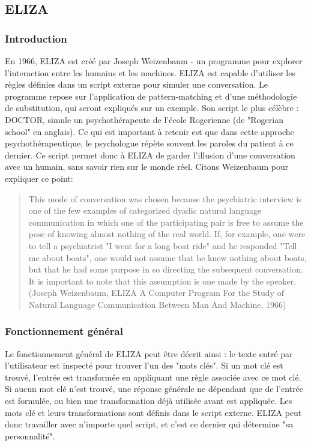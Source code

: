 \documentclass[11pt,a4paper]{report}
\begin{document}
    \subsection*{ELIZA}
      \subsubsection*{Introduction}
En 1966, ELIZA est créé par Joseph Weizenbaum - un programme pour explorer l'interaction entre les humains et 
les machines. ELIZA est capable d'utiliser les règles définies dans un script externe pour simuler 
une conversation. Le programme repose sur l'application de pattern-matching et d'une 
méthodologie de substitution, qui seront expliqués sur un exemple.
Son script le plus célèbre : DOCTOR, simule un psychothérapeute de l'école Rogerienne
(de "Rogerian school" en anglais). Ce qui est important à retenir est que dans cette approche 
psychothérapeutique, le psychologue répète souvent les paroles du patient à ce dernier. 
Ce script permet donc à ELIZA de garder l'illusion d'une conversation avec un humain, 
sans savoir rien sur le monde réel. Citons Weizenbaum pour expliquer ce point:

\begin{quote}
  This mode of conversation was chosen because the psychiatric interview is one of the 
  few examples of categorized dyadic natural 
  language communication in which one of the participating pair is free to assume the pose 
  of knowing almost nothing of the real world. If, for example, one were to tell a 
  psychiatrist "I went for a long boat ride" and he responded "Tell me about boats", 
  one would not assume that he knew nothing about boats, but that he had some purpose 
  in so directing the subsequent conversation. It is important to note that this 
  assumption is one made by the speaker. (Joseph Weizenbaum, ELIZA A Computer Program
  For the Study of Natural Language
  Communication Between Man
  And Machine, 1966)
\end{quote} 

      \subsubsection*{Fonctionnement général}
Le fonctionnement général de ELIZA peut être décrit ainsi : le texte entré par l'utilisateur 
est inspecté pour trouver l'un des "mots clés". Si un mot clé est trouvé, l'entrée est transformée 
en appliquant une règle associée avec ce mot clé. Si aucun mot clé n'est trouvé, une réponse générale 
ne dépendant que de l'entrée est formulée, ou bien une transformation déjà utilisée avant est appliquée. 
Les mots clé et leurs transformations sont définis dans le script externe. ELIZA peut donc travailler 
avec n'importe quel script, et c'est ce dernier qui détermine "sa personnalité". 
\end{document}
